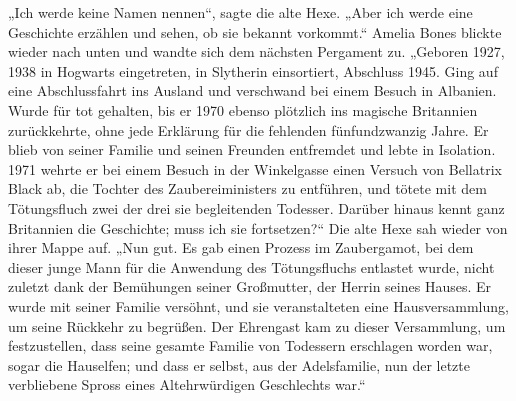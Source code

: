 „Ich werde keine Namen nennen“, sagte die alte Hexe. „Aber ich werde eine Geschichte erzählen und sehen, ob sie bekannt vorkommt.“
Amelia Bones blickte wieder nach unten und wandte sich dem nächsten Pergament zu. „Geboren 1927, 1938 in Hogwarts eingetreten, in Slytherin einsortiert, Abschluss 1945. Ging auf eine Abschlussfahrt ins Ausland und verschwand bei einem Besuch in Albanien. Wurde für tot gehalten, bis er 1970 ebenso plötzlich ins magische Britannien zurückkehrte, ohne jede Erklärung für die fehlenden fünfundzwanzig Jahre. Er blieb von seiner Familie und seinen Freunden entfremdet und lebte in Isolation. 1971 wehrte er bei einem Besuch in der Winkelgasse einen Versuch von Bellatrix Black ab, die Tochter des Zaubereiministers zu entführen, und tötete mit dem Tötungsfluch zwei der drei sie begleitenden Todesser. Darüber hinaus kennt ganz Britannien die Geschichte; muss ich sie fortsetzen?“
Die alte Hexe sah wieder von ihrer Mappe auf.
„Nun gut. Es gab einen Prozess im Zaubergamot, bei dem dieser junge Mann für die Anwendung des Tötungsfluchs entlastet wurde, nicht zuletzt dank der Bemühungen seiner Großmutter, der Herrin seines Hauses. Er wurde mit seiner Familie versöhnt, und sie veranstalteten eine Hausversammlung, um seine Rückkehr zu begrüßen. Der Ehrengast kam zu dieser Versammlung, um festzustellen, dass seine gesamte Familie von Todessern erschlagen worden war, sogar die Hauselfen; und dass er selbst, aus der Adelsfamilie, nun der letzte verbliebene Spross eines Altehrwürdigen Geschlechts war.“

